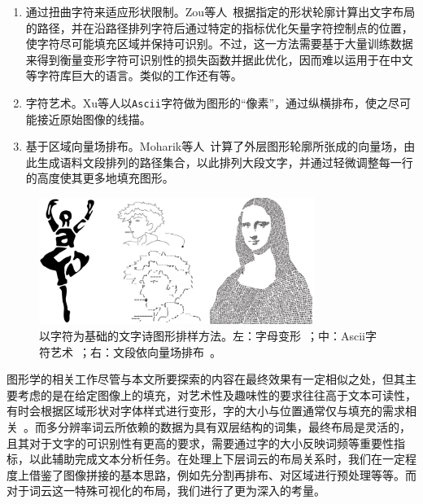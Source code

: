\begin{enumerate}
	\renewcommand{\labelenumi}{（\theenumi）}
	\item 通过扭曲字符来适应形状限制。Zou等人~\supercite{Zou2016}根据指定的形状轮廓计算出文字布局的路径，并在沿路径排列字符后通过特定的指标优化矢量字符控制点的位置，使字符尽可能填充区域并保持可识别。不过，这一方法需要基于大量训练数据来得到衡量变形字符可识别性的损失函数并据此优化，因而难以运用于在中文等字符库巨大的语言。类似的工作还有\parencite{Xu2007,Chi2018}等。
	\item 字符艺术。Xu等人\supercite{Xu2010}以\texttt{Ascii}字符做为图形的``像素''，通过纵横排布，使之尽可能接近原始图像的线描。
	\item 基于区域向量场排布。Moharik等人~\supercite{Moharik2011}计算了外层图形轮廓所张成的向量场，由此生成语料文段排列的路径集合，以此排列大段文字，并通过轻微调整每一行的高度使其更多地填充图形。
\end{enumerate}


\begin{figure}[htbp]
	\centering
	\includegraphics[width=0.8\textwidth]{figures/calligram.png}
	\caption{以字符为基础的文字诗图形排样方法。左：字母变形~\supercite{Zou2016}；中：Ascii字符艺术~\supercite{Xu2010}；右：文段依向量场排布~\supercite{Moharik2011}。}
	\label{fig:calligram}
\end{figure}

\bigbreak
图形学的相关工作尽管与本文所要探索的内容在最终效果有一定相似之处，但其主要考虑的是在给定图像上的填充，对艺术性及趣味性的要求往往高于文本可读性，有时会根据区域形状对字体样式进行变形，字的大小与位置通常仅与填充的需求相关~\supercite{Kyprianidis13}。而多分辨率词云所依赖的数据为具有双层结构的词集，最终布局是灵活的，且其对于文字的可识别性有更高的要求，需要通过字的大小反映词频等重要性指标，以此辅助完成文本分析任务。在处理上下层词云的布局关系时，我们在一定程度上借鉴了图像拼接的基本思路，例如先分割再排布、对区域进行预处理等等。而对于词云这一特殊可视化的布局，我们进行了更为深入的考量。


